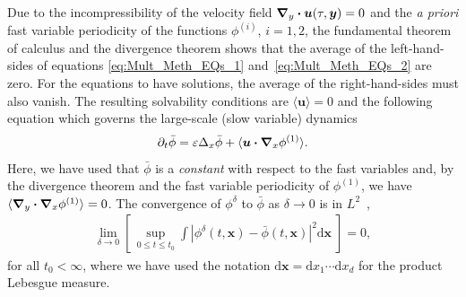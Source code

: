 \documentclass[leqno,onefignum,onetabnum]{siamltex1213}
\renewcommand{\d}{\mathrm{d}}
\newcommand\bnabla{\mbox{\boldmath${\nabla}$}}
\providecommand\bcdot{\boldsymbol{\cdot}}
\newcommand{\vecx}{\boldsymbol{x}}
\newcommand{\vecy}{\boldsymbol{y}}
\newcommand{\vecu}{\boldsymbol{u}}
\begin{document}
Due to the incompressibility of the velocity field
$\bnabla _y\bcdot\vecu (\tau,\vecy)=0$ and the \emph{a priori} fast variable
periodicity of the functions $\phi^{(i)}$, $i=1,2$,  the
fundamental theorem of calculus and the divergence theorem shows that
the average of the left-hand-sides of equations
\eqref{eq:Mult_Meth_EQs_1} and~\eqref{eq:Mult_Meth_EQs_2} are
zero. For the equations to have solutions, the average of the
right-hand-sides must also vanish.
The resulting solvability conditions are $\langle\vecu \rangle=0$
and the following equation which governs the large-scale (slow
variable) dynamics   
%
\begin{align}\label{eq:Avg_EQ_phi}
  \partial_t\bar{\phi}=\varepsilon\Delta_x\bar{\phi}+\langle\vecu \bcdot\bnabla _x\phi^{(1)}\rangle.
\end{align}
%
Here, we have used that $\bar{\phi}$ is a \emph{constant} with respect to
the fast variables and, by the divergence theorem and the fast
variable periodicity of $\phi^{(1)}$, we have
$\langle\bnabla _y\bcdot\bnabla _x\phi^{(1)}\rangle=0$. The convergence of $\phi^\delta$ to $\bar{\phi}$ as
$\delta\to0$ is in $L^2$~\cite{Fannjiang:1994:SIAM_JAM:333},  
%
\begin{align}
  \lim_{\delta\to0}\left[\,\sup_{0\leq t\leq t_0}
    \int\left|\phi^\delta(t,\vecx)-\bar{\phi}(t,\vecx)\right|^2\d\vecx
    \;\right]=0,
\end{align}
%
for all $t_0<\infty$, where we have used the notation $\d\vecx=\d x_1\cdots \d
x_d$ for the product Lebesgue measure.
\end{document}
